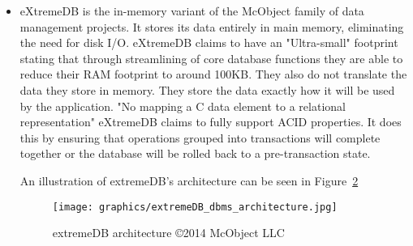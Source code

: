 \documentclass[letterpaper, 12pt]{article}
\begin{document}
\begin{itemize}
  dashDB uses a highly parallelized infrastructure optimized for columnar data
  exchange that is organized as such:
  \par\vspace{\baselineskip}
  A example of dasDB's query architecture can be seen in Figure~\ref{fig:dashdb_query}
  \begin{figure}
 	\centering
 	\label{fig:dashdb_query} 
 	\texttt{[image: graphics/dashDB\_query\_architecture.png]}
	\caption{Example of dashDB Query Architecture \copyright dashDB \cite{dashDB}}
  \end{figure}
\par\vspace{\baselineskip}
\item eXtremeDB is the in-memory variant of the McObject family of data management projects.
  It stores its data entirely in main memory, eliminating the need for disk I/O.
  eXtremeDB claims to have an "Ultra-small" footprint stating that through
  streamlining of core database functions they are able to reduce their RAM footprint
  to around 100KB. They also do not translate the data they store in memory. They
  store the data exactly how it will be used by the application. "No mapping a C data
  element to a relational representation"\cite{extremeDB} eXtremeDB claims to fully
  support ACID properties. It does this by ensuring that operations grouped into
  transactions will complete together or the database will be rolled back to a
  pre-transaction state.\cite{extremeDB}
  \par\vspace{\baselineskip}
  An illustration of extremeDB's architecture can be seen in Figure~\ref{fig:extremedb_architecture}
  \begin{figure}
	\centering
	\label{fig:extremedb_architecture}  
	\texttt{[image: graphics/extremeDB\_dbms\_architecture.jpg]}
	\caption{extremeDB architecture \copyright 2014 McObject LLC \cite{extremeDB}}
  \end{figure}
  \par\vspace{\baselineskip}


\end{itemize}
\end{document}
